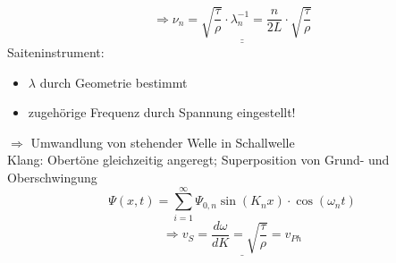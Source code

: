  $$ \Rightarrow \underline{\underline{\nu_n = \sqrt{\frac{\tau}{\rho}} \cdot \lambda_n^{-1} = \frac{n}{2L} \cdot \sqrt{\frac{\tau}{\rho} } } } $$
 Saiteninstrument:
 \begin{itemize}
 	\item $ \lambda $ durch Geometrie bestimmt
 	\item zugehörige Frequenz durch Spannung eingestellt!
 \end{itemize}
 $ \Rightarrow $ Umwandlung von stehender Welle in Schallwelle\\
 Klang: Obertöne gleichzeitig angeregt; Superposition von Grund- und Oberschwingung
 $$ \Psi(x,t) = \sum_{i=1}^{\infty} \Psi_{0,n} \sin(K_nx) \cdot \cos(\omega_nt) $$
 $$ \Rightarrow \underline{v_S = \frac{d\omega}{dK} = \sqrt{\frac{\tau}{\rho}} = v_{Ph}} $$